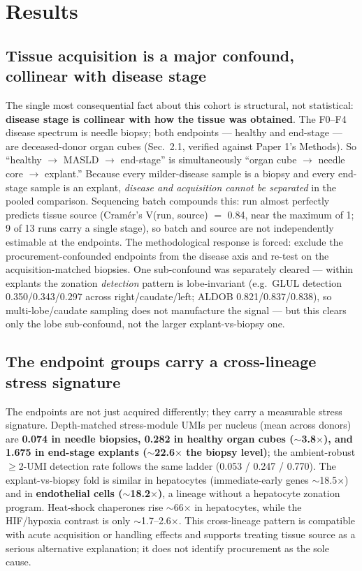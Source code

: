 \documentclass[11pt,a4paper]{article}
\begin{document}
\FloatBarrier
\section{Results}

\subsection{Tissue acquisition is a major confound, collinear with disease stage}

The single most consequential fact about this cohort is structural, not statistical: \textbf{disease stage is collinear with how the tissue was obtained}. The F0--F4 disease spectrum is needle biopsy; both endpoints --- healthy and end-stage --- are deceased-donor organ cubes (Sec.\ 2.1, verified against Paper 1's Methods). So ``healthy $\to$ MASLD $\to$ end-stage'' is simultaneously ``organ cube $\to$ needle core $\to$ explant.'' Because every milder-disease sample is a biopsy and every end-stage sample is an explant, \emph{disease and acquisition cannot be separated} in the pooled comparison. Sequencing batch compounds this: run almost perfectly predicts tissue source (Cram\'er's V(run, source) $=$ 0.84, near the maximum of 1; 9 of 13 runs carry a single stage), so batch and source are not independently estimable at the endpoints. The methodological response is forced: exclude the procurement-confounded endpoints from the disease axis and re-test on the acquisition-matched biopsies. One sub-confound was separately cleared --- within explants the zonation \emph{detection} pattern is lobe-invariant (e.g.\ GLUL detection 0.350/0.343/0.297 across right/caudate/left; ALDOB 0.821/0.837/0.838), so multi-lobe/caudate sampling does not manufacture the signal --- but this clears only the lobe sub-confound, not the larger explant-vs-biopsy one.

\subsection{The endpoint groups carry a cross-lineage stress signature}

The endpoints are not just acquired differently; they carry a measurable stress signature. Depth-matched stress-module UMIs per nucleus (mean across donors) are \textbf{0.074 in needle biopsies, 0.282 in healthy organ cubes ($\sim$3.8$\times$), and 1.675 in end-stage explants ($\sim$22.6$\times$ the biopsy level)}; the ambient-robust $\ge$2-UMI detection rate follows the same ladder (0.053 / 0.247 / 0.770). The explant-vs-biopsy fold is similar in hepatocytes (immediate-early genes $\sim$18.5$\times$) and in \textbf{endothelial cells ($\sim$18.2$\times$)}, a lineage without a hepatocyte zonation program. Heat-shock chaperones rise $\sim$66$\times$ in hepatocytes, while the HIF/hypoxia contrast is only $\sim$1.7--2.6$\times$. This cross-lineage pattern is compatible with acute acquisition or handling effects and supports treating tissue source as a serious alternative explanation; it does not identify procurement as the sole cause.
\end{document}
